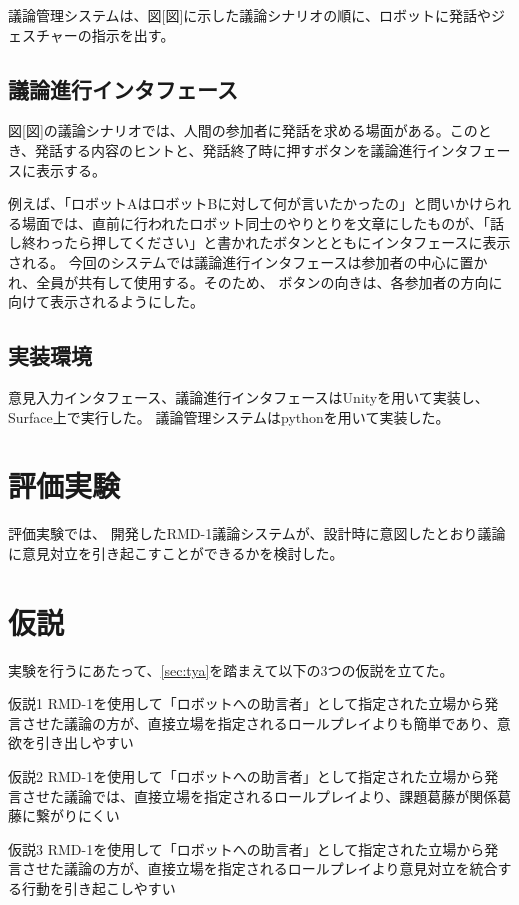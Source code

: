 \documentclass[11pt, a4paper]{jreport} %
\begin{document}
議論管理システムは、図[図]に示した議論シナリオの順に、ロボットに発話やジェスチャーの指示を出す。
	
\subsection{議論進行インタフェース}
図[図]の議論シナリオでは、人間の参加者に発話を求める場面がある。このとき、発話する内容のヒントと、発話終了時に押すボタンを議論進行インタフェースに表示する。


例えば、「ロボットAはロボットBに対して何が言いたかったの」と問いかけられる場面では、直前に行われたロボット同士のやりとりを文章にしたものが、「話し終わったら押してください」と書かれたボタンとともにインタフェースに表示される。
今回のシステムでは議論進行インタフェースは参加者の中心に置かれ、全員が共有して使用する。そのため、
ボタンの向きは、各参加者の方向に向けて表示されるようにした。



\subsection{実装環境}
意見入力インタフェース、議論進行インタフェースはUnityを用いて実装し、Surface上で実行した。
議論管理システムはpythonを用いて実装した。



\section{評価実験}
評価実験では、
開発したRMD-1議論システムが、設計時に意図したとおり議論に意見対立を引き起こすことができるかを検討した。

\section{仮説}
実験を行うにあたって、\ref{sec:tya}を踏まえて以下の3つの仮説を立てた。
\begin{description}
\item{仮説1} RMD-1を使用して「ロボットへの助言者」として指定された立場から発言させた議論の方が、直接立場を指定されるロールプレイよりも簡単であり、意欲を引き出しやすい
\item{仮説2} RMD-1を使用して「ロボットへの助言者」として指定された立場から発言させた議論では、直接立場を指定されるロールプレイより、課題葛藤が関係葛藤に繋がりにくい
\item{仮説3} RMD-1を使用して「ロボットへの助言者」として指定された立場から発言させた議論の方が、直接立場を指定されるロールプレイより意見対立を統合する行動を引き起こしやすい

\end{description}
\end{document}
